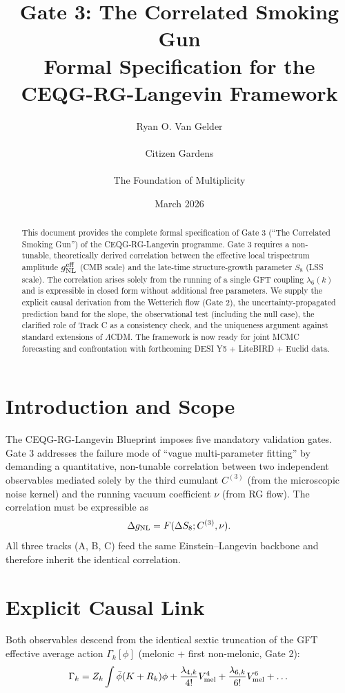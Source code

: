 \documentclass[11pt,a4paper]{article}
\title{Gate 3: The Correlated Smoking Gun \\ 
Formal Specification for the CEQG-RG-Langevin Framework}
\author{Ryan O. Van Gelder \\ \\
Citizen Gardens \\ \\
The Foundation of Multiplicity}
\date{March 2026}
\begin{document}
\maketitle

\begin{abstract}
This document provides the complete formal specification of Gate 3 (``The Correlated Smoking Gun'') of the CEQG-RG-Langevin programme. Gate 3 requires a non-tunable, theoretically derived correlation between the effective local trispectrum amplitude \(g_{\rm NL}^{\rm eff}\) (CMB scale) and the late-time structure-growth parameter \(S_8\) (LSS scale). The correlation arises solely from the running of a single GFT coupling \(\lambda_6(k)\) and is expressible in closed form without additional free parameters. We supply the explicit causal derivation from the Wetterich flow (Gate 2), the uncertainty-propagated prediction band for the slope, the observational test (including the null case), the clarified role of Track C as a consistency check, and the uniqueness argument against standard extensions of \(\Lambda\)CDM. The framework is now ready for joint MCMC forecasting and confrontation with forthcoming DESI Y5 + LiteBIRD + Euclid data.
\end{abstract}

\section{Introduction and Scope}
The CEQG-RG-Langevin Blueprint imposes five mandatory validation gates. Gate 3 addresses the failure mode of ``vague multi-parameter fitting'' by demanding a quantitative, non-tunable correlation between two independent observables mediated solely by the third cumulant \(C^{(3)}\) (from the microscopic noise kernel) and the running vacuum coefficient \(\nu\) (from RG flow). The correlation must be expressible as
\[
\Delta g_{\rm NL} = F(\Delta S_8; C^{(3)}, \nu).
\]
All three tracks (A, B, C) feed the same Einstein--Langevin backbone and therefore inherit the identical correlation.

\section{Explicit Causal Link}
Both observables descend from the identical sextic truncation of the GFT effective average action \(\Gamma_k[\phi]\) (melonic + first non-melonic, Gate 2):
\begin{equation}
\Gamma_k = Z_k \int \bar{\phi}(K + R_k)\phi + \frac{\lambda_{4,k}}{4!} V_{\rm mel}^4 + \frac{\lambda_{6,k}}{6!} V_{\rm mel}^6 + \dots
\end{equation}
\end{document}
